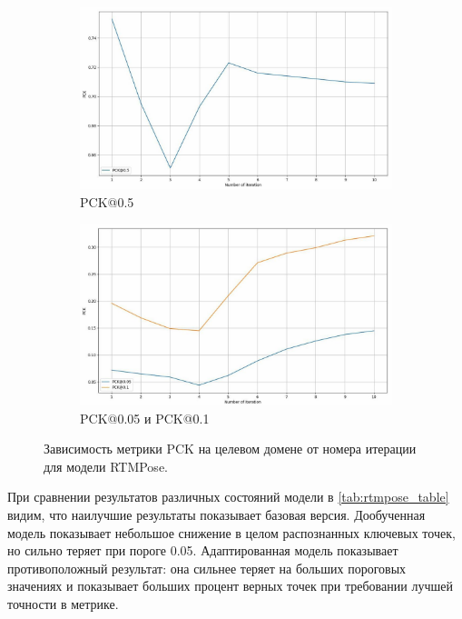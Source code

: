 \begin{figure}[H]
\centering
\begin{subfigure}{.95\textwidth}
	\centering
	\includegraphics[width=\textwidth]{./images/experiment/results/rtmpose/rtmpose_pck}
	\caption{PCK@0.5}
	\label{fig:rtmpose_pck_05}
\end{subfigure}
\begin{subfigure}{.95\textwidth}
	\centering
	\includegraphics[width=\textwidth]{./images/experiment/results/rtmpose/rtmpose_pck_small}
	\caption{PCK@0.05 и PCK@0.1}
	\label{fig:rtmpose_pck_small}
\end{subfigure}
\caption{Зависимость метрики PCK на целевом домене от номера итерации для модели RTMPose.}
\label{fig:rtmpose_pck}
\end{figure}

При сравнении результатов различных состояний модели в \autoref{tab:rtmpose_table} видим, что наилучшие результаты показывает базовая версия. Дообученная модель показывает небольшое снижение в целом распознанных ключевых точек, но сильно теряет при пороге 0.05. Адаптированная модель показывает противоположный результат: она сильнее теряет на больших пороговых значениях и показывает больших процент верных точек при требовании лучшей точности в метрике.

